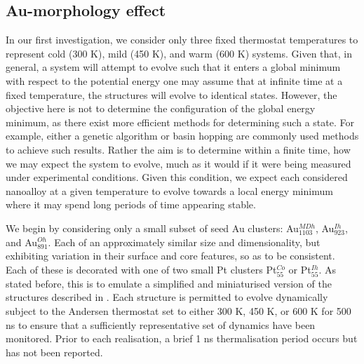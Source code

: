 \subsection{Au-morphology effect}

In our first investigation, we consider only three fixed thermostat temperatures to represent cold (300 K), mild (450 K), and warm (600 K) systems. Given that, in general, a system will attempt to evolve such that it enters a global minimum with respect to the potential energy one may assume that at infinite time at a fixed temperature, the structures will evolve to identical states. However, the objective here is not to determine the configuration of the global energy minimum, as there exist more efficient methods for determining such a state. For example, either a genetic algorithm \cite{YANG2018371,Fra_Ricardo_Review,Oakley2013-zl} or basin hopping \cite{Fra_Review,B204069G,doi:10.1021/jp207246m} are commonly used methods to achieve such results. Rather the aim is to determine within a finite time, how we may expect the system to evolve, much as it would if it were being measured under experimental conditions. Given this condition, we expect each considered nanoalloy at a given temperature to evolve towards a local energy minimum where it may spend long periods of time appearing stable. 

We begin by considering only a small subset of seed Au clusters: Au$_{1103}^{MDh}$, Au$_{923}^{Ih}$, and Au$_{891}^{Oh}$. Each of an approximately similar size and dimensionality, but exhibiting variation in their surface and core features, so as to be consistent. Each of these is decorated with one of two small Pt clusters Pt$_{55}^{Co}$ or Pt$_{55}^{Ih}$. As stated before, this is to emulate a simplified and miniaturised version of the structures described in \cite{Jorge2019}. Each structure is permitted to evolve dynamically subject to the Andersen thermostat set to either 300 K, 450 K, or 600 K for 500 ns to ensure that a sufficiently representative set of dynamics have been monitored. Prior to each realisation, a brief 1 ns thermalisation period occurs but has not been reported. 

